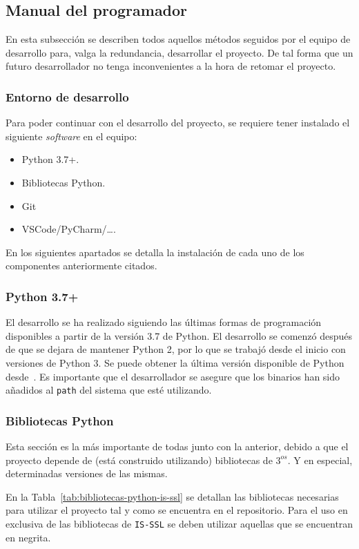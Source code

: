 \subsection{Manual del programador}
En esta subsección se describen todos aquellos métodos seguidos por el equipo de desarrollo para, valga la redundancia, desarrollar el proyecto. De tal forma que un futuro desarrollador no tenga inconvenientes a la hora de retomar el proyecto.

\subsubsection{Entorno de desarrollo}
Para poder continuar con el desarrollo del proyecto, se requiere tener instalado el siguiente \textit{software} en el equipo:
\begin{itemize}
\tightlist
\item Python 3.7+.
\item Bibliotecas Python.
\item Git
\item VSCode/PyCharm/\dots.
\end{itemize}

En los siguientes apartados se detalla la instalación de cada uno de los componentes anteriormente citados.

\subsubsection{Python 3.7+}
El desarrollo se ha realizado siguiendo las últimas formas de programación disponibles a partir de la versión 3.7 de Python. El desarrollo se comenzó después de que se dejara de mantener Python 2, por lo que se trabajó desde el inicio con versiones de Python 3. Se puede obtener la última versión disponible de Python desde~\cite{pythonGetIt}. Es importante que el desarrollador se asegure que los binarios han sido añadidos al \texttt{path} del sistema que esté utilizando.

\subsubsection{Bibliotecas Python}
Esta sección es la más importante de todas junto con la anterior, debido a que el proyecto depende de (está construido utilizando) bibliotecas de $3^{os}$. Y en especial, determinadas versiones de las mismas. 

En la Tabla~\ref{tab:bibliotecas-python-is-ssl} se detallan las bibliotecas necesarias para utilizar el proyecto tal y como se encuentra en el repositorio. Para el uso en exclusiva de las bibliotecas de \texttt{IS-SSL} se deben utilizar aquellas que se encuentran en negrita.

